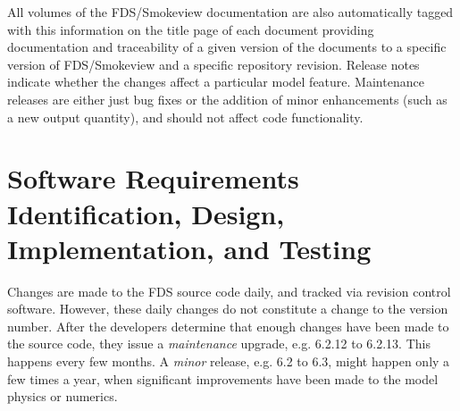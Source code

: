 \documentclass[11pt]{book}
\begin{document}
All volumes of the FDS/Smokeview documentation are also automatically tagged with this information on the title page of each document providing documentation and traceability of a given version of the documents to a specific version of FDS/Smokeview and a specific repository revision. Release notes indicate whether the changes affect a particular model feature. Maintenance releases are either just bug fixes or the addition of minor enhancements (such as a new output quantity), and should not affect code functionality.



\chapter{Software Requirements Identification, Design, Implementation, and Testing}

Changes are made to the FDS source code daily, and tracked via revision control software. However, these daily changes do not constitute a change to the version number. After the developers determine that enough changes have been made to the source code, they issue a {\em maintenance} upgrade, e.g. 6.2.12 to 6.2.13. This happens every few months. A {\em minor} release, e.g. 6.2 to 6.3, might happen only a few times a year, when significant improvements have been made to the model physics or numerics.
\end{document}
